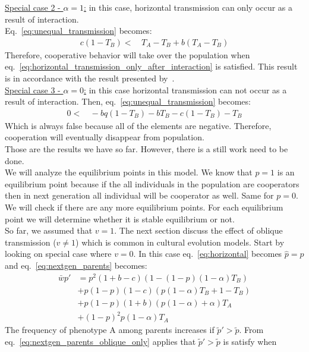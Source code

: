 \documentclass[12pt]{extarticle}
\begin{document}
\underline{Special case 2 - $\alpha =1$:} in this case, horizontal transmission can only occur as a result of interaction.
\\Eq.~\ref{eq:unequal_transmission} becomes:
\begin{equation} 
\begin{split} \label{eq:horizontal_transmission_only_after_interaction}
c(1-T_B)  < & \, T_A -T_B +b(T_A-T_B)
\end{split}
\end{equation}
Therefore, cooperative behavior will take over the population when eq.~\ref{eq:horizontal_transmission_only_after_interaction} is satisfied. 
This result is in accordance with the result presented by~\citet{lewin2017microbes}. 
\\\underline{Special case 3 - $\alpha = 0$:} in this case horizontal transmission can not occur as a result of interaction.  
Then, eq.~\ref{eq:unequal_transmission} becomes:
\begin{equation} 
\begin{split} \label{eq:horizontal_transmission_from_population}
0 < & \,  - bq(1-T_B)- bT_B-c(1-T_B)-T_B
\end {split}
\end{equation}
Which is always false because all of the elements are negative. Therefore, cooperation will eventually disappear from population.
\\Those are the results we have so far. However, there is a still work need to be done. \\
We will analyze the equilibrium points in this model. We know that $p=1$ is an equilibrium point because if the all individuals in the population are cooperators then in next generation all individual will be cooperator as well. Same for $p=0$. We will check if there are any more equilibrium points. For each equilibrium point we will determine whether it is stable equilibrium or not. 
\\So far, we assumed that $v=1$. The next section discuss the effect of oblique transmission ($v\neq 1$) which is common in cultural evolution models. Start by looking on special case where $v=0$. In this case eq.~\ref{eq:horizontal} becomes $\hat{p}=p$ and eq.~\ref{eq:nextgen_parents} becomes:
\begin{equation} 
\begin{split}\label{eq:nextgen_parents_oblique_only}
\bar{w} p' 
& = p^2 (1+b-c) (1 - (1-p) (1-\alpha) T_B) \\
& + p(1-p) (1-c) (p (1-\alpha) T_B + 1 - T_B) \\
& + p(1-p) (1+b) (p (1-\alpha) + \alpha) T_A \\
& + (1-p)^2 p (1-\alpha) T_A
\end{split}
\end{equation}
The frequency of phenotype A among parents increases if $\tilde{p}'>\tilde{p}$. From eq.~\ref{eq:nextgen_parents_oblique_only} applies that $\tilde{p}'>\tilde{p}$ is satisfy when
\end{document}
